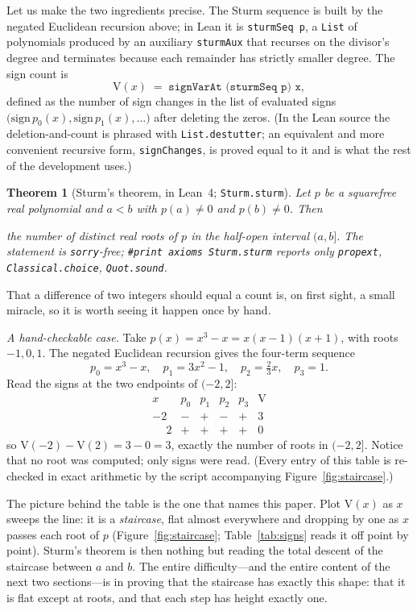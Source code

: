 \documentclass[11pt]{article}
\newtheorem{theorem}{Theorem}
\newcommand{\lean}[1]{\texttt{#1}}
\newcommand{\V}{\mathrm{V}}
\newcommand{\keyeq}[1]{\begin{center}\keybox{$\displaystyle #1$}\end{center}}
\begin{document}
Let us make the two ingredients precise. The Sturm sequence is built by the negated Euclidean
recursion above; in Lean it is \lean{sturmSeq p}, a \lean{List} of polynomials produced by an
auxiliary \lean{sturmAux} that recurses on the divisor's degree and terminates because each
remainder has strictly smaller degree. The sign count is
\[
  \V(x)\;=\;\lean{signVarAt (sturmSeq p) x},
\]
defined as the number of sign changes in the list of evaluated signs
$\big(\mathrm{sign}\,p_0(x),\mathrm{sign}\,p_1(x),\dots\big)$ after deleting the zeros. (In the
Lean source the deletion-and-count is phrased with \lean{List.destutter}; an equivalent and more
convenient recursive form, \lean{signChanges}, is proved equal to it and is what the rest of the
development uses.)

\begin{theorem}[Sturm's theorem, in Lean~4; \lean{Sturm.sturm}]\label{thm:sturm}
Let $p$ be a squarefree real polynomial and $a<b$ with $p(a)\ne0$ and $p(b)\ne0$. Then
\keyeq{\V(a)-\V(b)\;=\;\#\{x : a<x\le b,\ p(x)=0\},}
the number of \emph{distinct} real roots of $p$ in the half-open interval $(a,b]$. The statement
is \lean{sorry}-free; \lean{\#print axioms Sturm.sturm} reports only \lean{propext},
\lean{Classical.choice}, \lean{Quot.sound}.
\end{theorem}

That a difference of two integers should equal a count is, on first sight, a small miracle, so it
is worth seeing it happen once by hand.

\emph{A hand-checkable case.} Take $p(x)=x^3-x=x(x-1)(x+1)$, with roots $-1,0,1$. The negated
Euclidean recursion gives the four-term sequence
\[
  p_0=x^3-x,\quad p_1=3x^2-1,\quad p_2=\tfrac{2}{3}x,\quad p_3=1.
\]
Read the signs at the two endpoints of $(-2,2]$:
\[
  \begin{array}{c|cccc|c}
   x & p_0 & p_1 & p_2 & p_3 & \V \\\hline
   -2 & - & + & - & + & 3 \\
   \phantom{-}2 & + & + & + & + & 0
  \end{array}
\]
so $\V(-2)-\V(2)=3-0=3$, exactly the number of roots in $(-2,2]$. Notice that no root was
computed; only signs were read. (Every entry of this table is re-checked in exact arithmetic by
the script accompanying Figure~\ref{fig:staircase}.)

The picture behind the table is the one that names this paper. Plot $\V(x)$ as $x$ sweeps the
line: it is a \emph{staircase}, flat almost everywhere and dropping by one as $x$ passes each root
of $p$ (Figure~\ref{fig:staircase}; Table~\ref{tab:signs} reads it off point by point). Sturm's
theorem is then nothing but reading the total descent of the staircase between $a$ and $b$. The entire difficulty---and the entire content of the next
two sections---is in proving that the staircase has exactly this shape: that it is flat except at
roots, and that each step has height exactly one.
\end{document}

